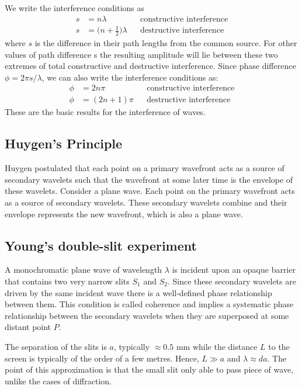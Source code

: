 \documentclass[../../../main.tex]{subfiles}
\begin{document}
We write the interference conditions as
\begin{align*}
    s &= n\lambda &&\text{constructive interference}\\
    s &= \biggl(n+\frac{1}{2}\biggr)\lambda&&\text{destructive interference}
\end{align*}
where $s$ is the difference in their path lengths from the common source. For other values of path difference s the resulting amplitude will lie between these two extremes of total constructive and destructive interference. Since phase difference $\phi=2\pi s/\lambda$, we can also write the interference conditions as:
\begin{align*}
    \phi &= 2n\pi &&\text{constructive interference}\\
    \phi &= (2n+1)\pi&&\text{destructive interference}
\end{align*}
These are the basic results for the interference of waves.

\subsection*{Huygen's Principle}
Huygen postulated that each point on a primary wavefront acts as a source of secondary wavelets such that the wavefront at some later time is the envelope of these wavelets. Consider a plane wave. Each point on the primary wavefront acts as a source of secondary wavelets. These secondary wavelets combine and their envelope represents the new wavefront, which is also a plane wave.

\begin{figure*}[h]
    \centering
\end{figure*}


\subsection*{Young's double-slit experiment}
A monochromatic plane wave of wavelength $\lambda$ is incident upon an opaque barrier that contains two very narrow slits $S_1$ and $S_2$. Since these secondary wavelets are driven by the same incident wave there is a well-defined phase relationship between them. This condition is called coherence and implies a systematic phase relationship between the secondary wavelets when they are superposed at some distant point $P$. 

The separation of the slits is $a$, typically $\approx0.5$ mm while the 
distance $L$ to the screen is typically of the order of a few metres. Hence, $L \gg a$ and $\lambda\approx da$. The point of this approximation is that the small slit only able to pass piece of wave, unlike the cases of diffraction.
\end{document}
